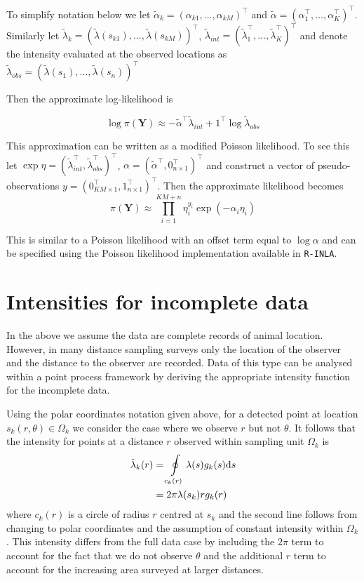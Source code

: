 \documentclass[preprint,12pt]{elsarticle}
\newcommand{\bm}{\boldsymbol}  %
\newcommand{\tl}{\tilde{\lambda}}   %
\begin{document}
To simplify notation below we let $\tilde{\alpha}_{k} = (\alpha_{k1}, \ldots, \alpha_{kM})^\intercal$ and $\tilde{\alpha} = (\alpha_1^\intercal, \ldots, \alpha_K^\intercal)^\intercal$.  Similarly let $\tl_k = (\tl(s_{k1}), \ldots, \tl(s_{kM}))^\intercal$, $\tl_{int} = (\tl_1^\intercal, \ldots, \tl_K^\intercal)^\intercal$ and denote the intensity evaluated at the observed locations as $\tl_{obs} = (\tl(s_1), \ldots, \tl(s_n))^\intercal$

Then the approximate log-likelihood is

\begin{equation}
\label{approx-log-likelihood}
	\log \pi(\bm{Y}) \approx - \tilde{\alpha}^\intercal \tl_{int} + 1^\intercal\log\tl_{obs}
\end{equation}

This approximation can be written as a modified Poisson likelihood.  To see this let $\exp \eta = (\tl_{int}^\intercal, \tl_{obs}^\intercal)^\intercal$,
$\alpha = (\tilde{\alpha}^\intercal, 0_{n \times 1}^\intercal)^\intercal$ and construct a vector of pseudo-observations $y = (0_{KM\times 1}^\intercal, 1_{n \times 1}^\intercal)^\intercal$.  Then the approximate likelihood becomes
\begin{equation}
\pi(\bm{Y}) \approx \prod_{i=1}^{KM + n} \eta_i^{y_i}\exp(-\alpha_i\eta_i)
\end{equation}

This is similar to a Poisson likelihood with an offset term equal to $\log\alpha$ and can be specified using the Poisson likelihood implementation available in \texttt{R-INLA}.


\section*{Intensities for incomplete data}

In the above we assume the data are complete records of animal location.  However, in many distance sampling surveys only the location of the observer and the distance to the observer are recorded.  Data of this type can be analysed within a point process framework by deriving the appropriate intensity function for the incomplete data.

Using the polar coordinates notation given above, for a detected point at location $s_k(r, \theta) \in \Omega_k$ we consider the case where we observe $r$ but not $\theta$.  It follows that the intensity for points at a distance $r$ observed within sampling unit $\Omega_k$ is
\begin{align}
\label{intensity-incomplete}
\tl_k(r) &= \oint\displaylimits_{c_k(r)} \lambda(s)g_k(s)\mathrm{d}s \nonumber \\
&= 2\pi\lambda(s_k)rg_k(r)
\end{align}
 where $c_k(r)$ is a circle of radius $r$ centred at $s_k$ and the second line follows from changing to polar coordinates and the assumption of constant intensity within $\Omega_k$.  This intensity differs from the full data case by including the $2\pi$  term to account for the fact that we do not observe $\theta$ and the additional $r$ term to account for the increasing area surveyed at larger distances.
\end{document}
